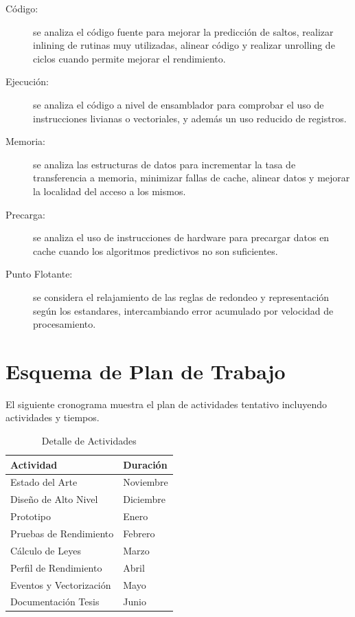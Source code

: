 \documentclass[a4paper]{article}
\begin{document}
\begin{description}
\item[Código:] se analiza el código fuente para mejorar la predicción de saltos, realizar inlining de rutinas muy utilizadas, alinear código y realizar unrolling de ciclos cuando permite mejorar el rendimiento.
\item[Ejecución:] se analiza el código a nivel de ensamblador para comprobar el uso de instrucciones livianas o vectoriales, y además un uso reducido de registros.
\item[Memoria:] se analiza las estructuras de datos para incrementar la tasa de transferencia a memoria, minimizar fallas de cache, alinear datos y mejorar la localidad del acceso a los mismos.
\item[Precarga:] se analiza el uso de instrucciones de hardware para precargar datos en cache cuando los algoritmos predictivos no son suficientes.
\item[Punto Flotante:] se considera el relajamiento de las reglas de redondeo y representación según los estandares, intercambiando error acumulado por velocidad de procesamiento.
\end{description}

\section{Esquema de Plan de Trabajo}

El siguiente cronograma muestra el plan de actividades tentativo incluyendo actividades y tiempos.

\begin{table}[H]
  \caption{Detalle de Actividades}
  \centering
    \begin{tabular}{|l|l|}\hline
      {\bf Actividad} & {\bf Duración} \\ \hline
      Estado del Arte & Noviembre \\ \hline
      Diseño de Alto Nivel & Diciembre \\ \hline
      Prototipo & Enero \\ \hline
      Pruebas de Rendimiento & Febrero \\ \hline
      Cálculo de Leyes & Marzo \\ \hline
      Perfil de Rendimiento & Abril \\ \hline
      Eventos y Vectorización & Mayo \\ \hline
      Documentación Tesis & Junio \\ \hline
    \end{tabular}
  \label{schedule}
\end{table}
\end{document}
